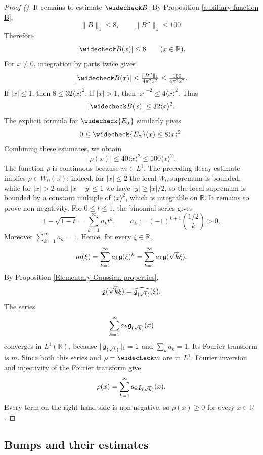 \documentclass[12pt,reqno]{amsart}
\newcommand{\auto}{{({\tiny\faCar})}}
\theoremstyle{plain}
\numberwithin{equation}{section}
\theoremstyle{remark}
\newcommand{\R}{{\mathbb R}}
\newcommand{\jr}[1]{{\color{orange}{[J: #1]}}}
\begin{document}
\begin{proof}[Proof \auto]
It remains to estimate \(\widecheck B\). By Proposition \ref{auxiliary function B},
\[
    \|B\|_1\le 8,
    \qquad
    \|B''\|_1\le 100.
\]
Therefore
\[
    |\widecheck B(x)|\le 8
    \qquad (x\in\R).
\]
For \(x\neq 0\), integration by parts twice gives
\[
    |\widecheck B(x)|
    \le
    \tfrac{\|B''\|_1}{4\pi^2x^2}
    \le
    \tfrac{100}{4\pi^2x^2}.
\]
If $|x|\le1$, then $8\le32\langle x\rangle^2$. If $|x|>1$, then $|x|^{-2}\le4\langle x\rangle^2$. Thus
\begin{equation}\label{eq:Bcheck-decay}
|\widecheck B(x)|\le32\langle x\rangle^2.
\end{equation}
The explicit formula for $\widecheck{E_\alpha}$ similarly gives
\[
0\le\widecheck{E_\alpha}(x)\le8\langle x\rangle^2.
\]
Combining these estimates, we obtain\jr{GPT: In the following line we are for no good reason estimating $40$ by a $100$. The correct thing to do is to instead try to change the final constant to $40$, similar with other explicit constants everywhere in the text. Check if they can be improved 'for free' or with minor modifications to the argument.}
\[
|\rho(x)|\le40\langle x\rangle^2\le100\langle x\rangle^2.
\]
The function \(\rho\) is continuous because \(m\in L^1\). The preceding decay estimate implies
\(\rho\in W_0(\R)\): indeed, for \(|x|\le 2\) the local \(W_0\)-supremum is bounded, while for
\(|x|>2\) and \(|x-y|\le 1\) we have \(|y|\ge |x|/2\), so the local supremum is bounded by a
constant multiple of \(\langle x\rangle^{2}\), which is integrable on \(\R\).
It remains to prove non-negativity. For \(0\le t\le 1\), the binomial series gives
\[
    1-\sqrt{1-t}
    =
    \sum_{k=1}^\infty a_k t^k,
    \qquad
    a_k:=(-1)^{k+1}\binom{1/2}{k}>0.
\]
Moreover \(\sum_{k=1}^\infty a_k=1\). Hence, for every \(\xi\in\R\),
\[
    m(\xi)
    =
    \sum_{k=1}^\infty a_k \mathfrak{g}(\xi)^k
    =
    \sum_{k=1}^\infty a_k \mathfrak{g}(\sqrt{k}\xi).
\]
By Proposition \ref{Elementary Gaussian properties},
\[
    \mathfrak{g}(\sqrt{k}\xi)=\widehat{\mathfrak{g}_{(\sqrt{k})}}(\xi).
\]
The series
\[
\sum_{k=1}^\infty a_k\mathfrak{g}_{(\sqrt{k})}(x)
\]
converges in $L^1(\R)$, because $\|\mathfrak{g}_{(\sqrt{k})}\|_1=1$ and $\sum_ka_k=1$. Its Fourier transform is $m$. Since both this series and $\rho=\widecheck m$ are in $L^1$, Fourier inversion and injectivity of the Fourier transform give
\[
    \rho(x)
    =
    \sum_{k=1}^\infty a_k \mathfrak{g}_{(\sqrt{k})}(x).
\]
Every term on the right-hand side is non-negative, so \(\rho(x)\ge 0\) for every \(x\in\R\).
\end{proof}

\subsection{Bumps and their estimates}\label{bump section}
\end{document}
